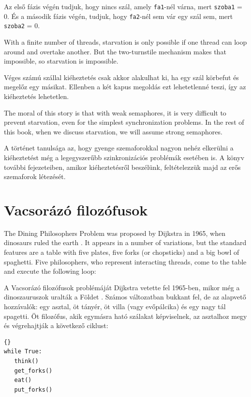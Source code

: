 \documentclass{book}
\newcommand{\clearemptydoublepage}{\newpage\cleardoublepage}
\begin{document}
Az első fázis végén tudjuk, hogy nincs szál, amely {\tt fa1}-nél várna,
mert {\tt szoba1} = 0. És a második fázis végén, tudjuk, hogy {\tt fa2}-nél sem vár egy
szál sem, mert {\tt szoba2} = 0.

With a finite number of threads, starvation is only possible if one
thread can loop around and overtake another.  But the two-turnstile
mechanism makes that impossible, so starvation is impossible.

Véges számú szállal kiéheztetés csak akkor alakulhat ki, ha egy szál körbefut
és megelőz egy másikat. Ellenben a két kapus megoldás ezt lehetetlenné
teszi, így az kiéheztetés lehetetlen.

The moral of this story is that with weak semaphores, it is very
difficult to prevent starvation, even for the simplest synchronization
problems.  In the rest of this book, when we discuss starvation, we
will assume strong semaphores.

A történet tanulsága az, hogy gyenge szemaforokkal nagyon nehéz elkerülni a
kiéheztetést még a legegyszerűbb szinkronizációs problémák esetében is.
A könyv további fejezeteiben, amikor kiéheztetésről beszélünk,
feltételezzük majd az erős szemaforok létezését.

\clearemptydoublepage
\section{Vacsorázó filozófusok}
\label{dining}

The Dining Philosophers Problem was proposed by Dijkstra in
1965, when dinosaurs ruled the earth \cite{dijkstra65}.  It
appears in a number of variations, but the standard features
are a table with five plates, five forks (or chopsticks) and
a big bowl of spaghetti.  Five philosophers, who represent
interacting threads, come to the table and execute the
following loop:

A Vacsorázó filozófusok problémáját  Dijkstra vetette fel 1965-ben,
mikor még a dinoszauruszok uralták a Földet \cite{dijkstra65}.
Számos változatban
bukkant fel, de az alapvető hozzávalók: egy asztal, öt tányér, öt
villa (vagy evőpálcika) és egy nagy tál spagetti.
Öt filozófus, akik egymásra ható szálakat képviselnek, az asztalhoz
megy és végrehajtják a következő ciklust:

\begin{lstlisting}[title={Basic philosopher loop}]{}
while True:
   think()
   get_forks()
   eat()
   put_forks()
\end{lstlisting}
\end{document}
